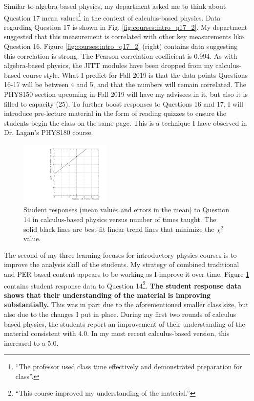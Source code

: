 \documentclass[../../main.tex]{subfiles}
\begin{document}
Similar to algebra-based physics, my department asked me to think about Question 17 mean values\footnote{``The professor used class time effectively and demonstrated preparation for class''.} in the context of calculus-based physics.  Data regarding Question 17 is shown in Fig. \ref{fig:courses:intro_q17_2}.  My department suggested that this measurement is correlated with other key measurements like Question 16.  Figure \ref{fig:courses:intro_q17_2} (right) contains data suggesting this correlation is strong.  The Pearson correlation coefficient is 0.994.  As with algebra-based physics, the JITT modules have been dropped from my calculus-based course style.  What I predict for Fall 2019 is that the data points Questions 16-17 will be between 4 and 5, and that the numbers will remain correlated.  The PHYS150 section upcoming in Fall 2019 will have my advisees in it, but also it is filled to capacity (25).  To further boost responses to Questions 16 and 17, I will introduce pre-lecture material in the form of reading quizzes to ensure the students begin the class on the same page.  This is a technique I have observed in Dr. Lagan's PHYS180 course.  \\ \hspace{0.1cm}

\begin{figure}[hb]
\centering
\includegraphics[width=0.4\textwidth]{Q14_calculus_based.pdf}
\caption{\label{fig:courses:intro_q14_2}  Student responses (mean values and errors in the mean) to Question 14 in calculus-based physics versus number of times taught.  The solid black lines are best-fit linear trend lines that minimize the $\chi^2$ value.}
\end{figure}

The second of my three learning focuses for introductory physics courses is to improve the analysis skill of the students.  My strategy of combined traditional and PER based content appears to be working as I improve it over time.  Figure \ref{fig:courses:intro_q14_2} contains student response data to Question 14\footnote{``This course  improved my understanding of the material.''}.  \textbf{The student response data shows that their understanding of the material is improving substantially.}  This was in part due to the aforementioned smaller class size, but also due to the changes I put in place.  During my first two rounds of calculus based physics, the students report an improvement of their understanding of the material consistent with 4.0.  In my most recent calculus-based version, this increased to a 5.0. \\ \hspace{0.1cm}
\end{document}
